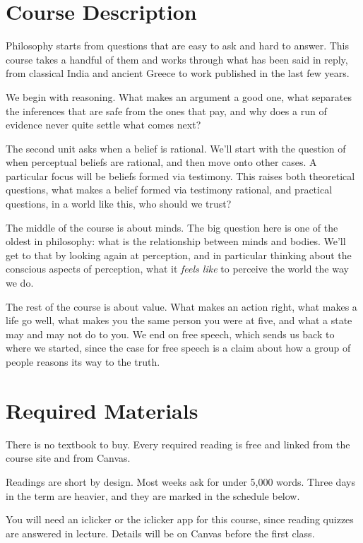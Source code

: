\documentclass[
  letterpaper,
  DIV=11,
  numbers=noendperiod]{scrartcl}
\begin{document}
\section{Course Description}\label{course-description}

Philosophy starts from questions that are easy to ask and hard to
answer. This course takes a handful of them and works through what has
been said in reply, from classical India and ancient Greece to work
published in the last few years.

We begin with reasoning. What makes an argument a good one, what
separates the inferences that are safe from the ones that pay, and why
does a run of evidence never quite settle what comes next?

The second unit asks when a belief is rational. We'll start with the
question of when perceptual beliefs are rational, and then move onto
other cases. A particular focus will be beliefs formed via testimony.
This raises both theoretical questions, what makes a belief formed via
testimony rational, and practical questions, in a world like this, who
should we trust?

The middle of the course is about minds. The big question here is one of
the oldest in philosophy: what is the relationship between minds and
bodies. We'll get to that by looking again at perception, and in
particular thinking about the conscious aspects of perception, what it
\emph{feels like} to perceive the world the way we do.

The rest of the course is about value. What makes an action right, what
makes a life go well, what makes you the same person you were at five,
and what a state may and may not do to you. We end on free speech, which
sends us back to where we started, since the case for free speech is a
claim about how a group of people reasons its way to the truth.

\section{Required Materials}\label{required-materials}

There is no textbook to buy. Every required reading is free and linked
from the course site and from Canvas.

Readings are short by design. Most weeks ask for under 5,000 words.
Three days in the term are heavier, and they are marked in the schedule
below.

You will need an iclicker or the iclicker app for this course, since
reading quizzes are answered in lecture. Details will be on Canvas
before the first class.
\end{document}
